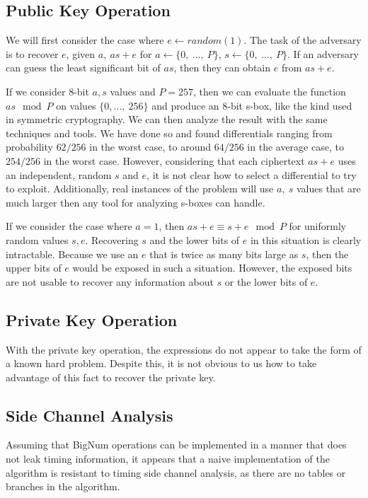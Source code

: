 \documentclass[preprint]{iacrtrans}
\begin{document}
\subsection{Public Key Operation}
We will first consider the case where $e \leftarrow random(1)$. The task of the adversary is to recover $e$, given $a,\ a s + e$ for $a \leftarrow \{0,\ \dots,\ P\}$, $s \leftarrow \{0,\ \dots,\ P\}$. If an adversary can guess the least significant bit of $a s$, then they can obtain $e$ from $a s + e$.

If we consider 8-bit $a, s$ values and $P = 257$, then we can evaluate the function $a s \mod P$ on values $\{0,\dots,\ 256\}$ and produce an 8-bit s-box, like the kind used in symmetric cryptography. We can then analyze the result with the same techniques and tools. We have done so and found differentials ranging from probability $62/256$ in the worst case, to around $64/256$ in the average case, to $254/256$ in the worst case. However, considering that each ciphertext $a s + e$ uses an independent, random $s$ and $e$, it is not clear how to select a differential to try to exploit. Additionally, real instances of the problem will use $a,\ s$ values that are much larger then any tool for analyzing s-boxes can handle.

If we consider the case where $a = 1$, then $a s + e \equiv s + e \mod P$ for uniformly random values $s, e$. Recovering $s$ and the lower bits of $e$ in this situation is clearly intractable. Because we use an $e$ that is twice as many bits large as $s$, then the upper bits of $e$ would be exposed in such a situation. However, the exposed bits are not usable to recover any information about $s$ or the lower bits of $e$.

\subsection{Private Key Operation}
With the private key operation, the expressions do not appear to take the form of a known hard problem. Despite this, it is not obvious to us how to take advantage of this fact to recover the private key. 

\subsection{Side Channel Analysis}
Assuming that BigNum operations can be implemented in a manner that does not leak timing information, it appears that a naive implementation of the algorithm is resistant to timing side channel analysis, as there are no tables or branches in the algorithm.
\end{document}
